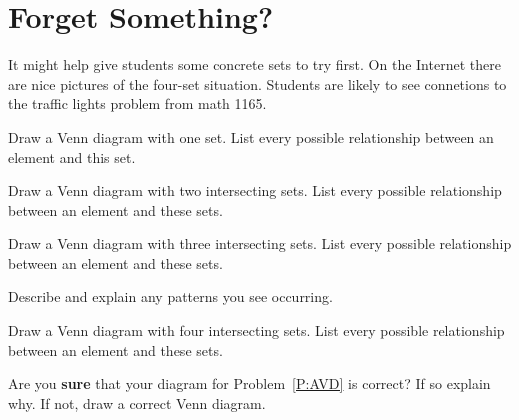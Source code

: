 \newpage
\section{Forget Something?} 

\begin{teachingnote}
It might help give students some concrete sets to try first.  On the Internet there are nice pictures of the four-set situation. Students are likely to see connetions to the traffic lights problem from math 1165.
\end{teachingnote}

\begin{prob} 
Draw a Venn diagram with one set. List every possible relationship
between an element and this set. 
\end{prob}

\begin{prob} 
Draw a Venn diagram with two intersecting sets. List every possible
relationship between an element and these sets.
\end{prob}


\begin{prob} 
Draw a Venn diagram with three intersecting sets. List every possible
relationship between an element and these sets.
\end{prob}

\begin{prob}
Describe and explain any patterns you see occurring.
\end{prob}

\begin{prob}\label{P:AVD}
Draw a Venn diagram with four intersecting sets. List every possible
relationship between an element and these sets.
\end{prob}

\begin{prob}
Are you \textbf{sure} that your diagram for Problem~\ref{P:AVD} is
correct? If so explain why. If not, draw a correct Venn diagram.
\end{prob}
